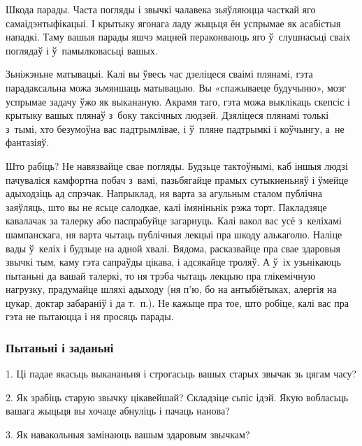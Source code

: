 Шкода парады. Часта погляды і звычкі чалавека зьяўляюцца часткай яго самаідэнтыфікацыі. І крытыку ягонага ладу жыцьця ён успрымае як асабістыя нападкі. Таму вашыя парады яшчэ мацней пераконваюць яго ў~слушнасьці сваіх поглядаў і ў~памылковасьці вашых.

Зьніжэньне матывацыі. Калі вы ўвесь час дзеліцеся сваімі плянамі, гэта парадаксальна можа зьмяншаць матывацыю. Вы «спажываеце будучыню», мозг успрымае задачу ўжо як выкананую. Акрамя таго, гэта можа выклікаць скепсіс і крытыку вашых плянаў з~боку таксічных людзей. Дзяліцеся плянамі толькі з~тымі, хто безумоўна вас падтрымлівае, і ў~пляне падтрымкі і коўчынгу, а~не фантазіяў.

Што рабіць? Не навязвайце свае погляды. Будзьце тактоўнымі, каб іншыя людзі пачуваліся камфортна побач з~вамі, пазьбягайце прамых сутыкненьняў і ўмейце адыходзіць ад спрэчак. Напрыклад, ня варта за агульным сталом публічна заяўляць, што вы не ясьце салодкае, калі імяніньнік рэжа торт. Пакладзяце кавалачак за талерку або паспрабуйце загарнуць. Калі вакол вас усё з~келіхамі шампанскага, ня варта чытаць публічныя лекцыі пра шкоду алькаголю. Наліце вады ў~келіх і будзьце на адной хвалі. Вядома, расказвайце пра свае здаровыя звычкі тым, каму гэта сапраўды цікава, і адсякайце троляў. А ў~іх узьнікаюць пытаньні да вашай талеркі, то ня трэба чытаць лекцыю пра глікемічную нагрузку, прадумайце шляхі адыходу (ня п'ю, бо на антыбіётыках, алергія на цукар, доктар забараніў і да т.~п.). Не кажыце пра тое, што робіце, калі вас пра гэта не пытаюцца і ня просяць парады.

\subsubsection{Пытаньні і заданьні}

1. Ці падае якасьць выкананьня і строгасьць вашых старых звычак зь цягам часу?

2. Як зрабіць старую звычку цікавейшай? Складзіце сьпіс ідэй. Якую вобласьць вашага жыцьця вы хочаце абнуліць і пачаць нанова?

3. Як навакольныя замінаюць вашым здаровым звычкам?
